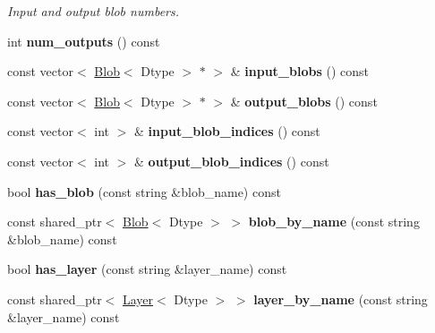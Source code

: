 \begin{DoxyCompactItemize}
\begin{DoxyCompactList}\small\item\em Input and output blob numbers. \end{DoxyCompactList}\item 
\mbox{\label{classcaffe_1_1_net_a335522f32062225c472382dbb5aff176}} 
int {\bfseries num\+\_\+outputs} () const
\item 
\mbox{\label{classcaffe_1_1_net_a986652086c495810e1558208e60fd3a6}} 
const vector$<$ \mbox{\hyperlink{classcaffe_1_1_blob}{Blob}}$<$ Dtype $>$ $\ast$ $>$ \& {\bfseries input\+\_\+blobs} () const
\item 
\mbox{\label{classcaffe_1_1_net_a1ca04c0622bab2857e30c3e07ef85d9c}} 
const vector$<$ \mbox{\hyperlink{classcaffe_1_1_blob}{Blob}}$<$ Dtype $>$ $\ast$ $>$ \& {\bfseries output\+\_\+blobs} () const
\item 
\mbox{\label{classcaffe_1_1_net_a904ff62c3013aa9e2a02687c7d01871a}} 
const vector$<$ int $>$ \& {\bfseries input\+\_\+blob\+\_\+indices} () const
\item 
\mbox{\label{classcaffe_1_1_net_a7358f4e7ee8c689d83be22d31213fad8}} 
const vector$<$ int $>$ \& {\bfseries output\+\_\+blob\+\_\+indices} () const
\item 
\mbox{\label{classcaffe_1_1_net_a5e0397a88782627b93532800e825e42b}} 
bool {\bfseries has\+\_\+blob} (const string \&blob\+\_\+name) const
\item 
\mbox{\label{classcaffe_1_1_net_a45d1cbc534a33d390894d7daafbafe7b}} 
const shared\+\_\+ptr$<$ \mbox{\hyperlink{classcaffe_1_1_blob}{Blob}}$<$ Dtype $>$ $>$ {\bfseries blob\+\_\+by\+\_\+name} (const string \&blob\+\_\+name) const
\item 
\mbox{\label{classcaffe_1_1_net_a86c0a37d300bcf100d18f40b3f50032d}} 
bool {\bfseries has\+\_\+layer} (const string \&layer\+\_\+name) const
\item 
\mbox{\label{classcaffe_1_1_net_a0d20d608b694fc333c4042df26ccf5ca}} 
const shared\+\_\+ptr$<$ \mbox{\hyperlink{classcaffe_1_1_layer}{Layer}}$<$ Dtype $>$ $>$ {\bfseries layer\+\_\+by\+\_\+name} (const string \&layer\+\_\+name) const

\end{DoxyCompactItemize}
